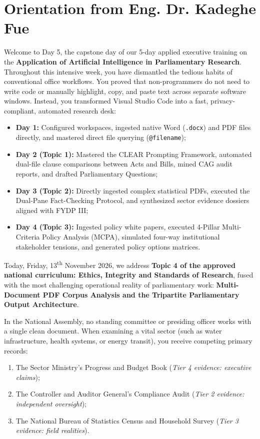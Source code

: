 \documentclass[11pt, a4paper]{report}
\begin{document}
\section{Orientation from Eng. Dr. Kadeghe Fue}
Welcome to Day 5, the capstone day of our 5-day applied executive training on the \textbf{Application of Artificial Intelligence in Parliamentary Research}. Throughout this intensive week, you have dismantled the tedious habits of conventional office workflows. You proved that non-programmers do not need to write code or manually highlight, copy, and paste text across separate software windows. Instead, you transformed Visual Studio Code into a fast, privacy-compliant, automated research desk:
\begin{itemize}[label=-]
    \item \textbf{Day 1:} Configured workspaces, ingested native Word (\texttt{.docx}) and PDF files directly, and mastered direct file querying (\texttt{@filename});
    \item \textbf{Day 2 (Topic 1):} Mastered the CLEAR Prompting Framework, automated dual-file clause comparisons between Acts and Bills, mined CAG audit reports, and drafted Parliamentary Questions;
    \item \textbf{Day 3 (Topic 2):} Directly ingested complex statistical PDFs, executed the Dual-Pane Fact-Checking Protocol, and synthesized sector evidence dossiers aligned with FYDP III;
    \item \textbf{Day 4 (Topic 3):} Ingested policy white papers, executed 4-Pillar Multi-Criteria Policy Analysis (MCPA), simulated four-way institutional stakeholder tensions, and generated policy options matrices.
\end{itemize}

Today, Friday, 13\textsuperscript{th} November 2026, we address \textcolor{suagreen}{\textbf{Topic 4 of the approved national curriculum: Ethics, Integrity and Standards of Research}}, fused with the most challenging operational reality of parliamentary work: \textcolor{tanzaniablue}{\textbf{Multi-Document PDF Corpus Analysis and the Tripartite Parliamentary Output Architecture}}.

In the National Assembly, no standing committee or presiding officer works with a single clean document. When examining a vital sector (such as water infrastructure, health systems, or energy transit), you receive competing primary records:
\begin{enumerate}
    \item The Sector Ministry's Progress and Budget Book (\textit{Tier 4 evidence: executive claims});
    \item The Controller and Auditor General's Compliance Audit (\textit{Tier 2 evidence: independent oversight});
    \item The National Bureau of Statistics Census and Household Survey (\textit{Tier 3 evidence: field realities}).
\end{enumerate}
\end{document}
